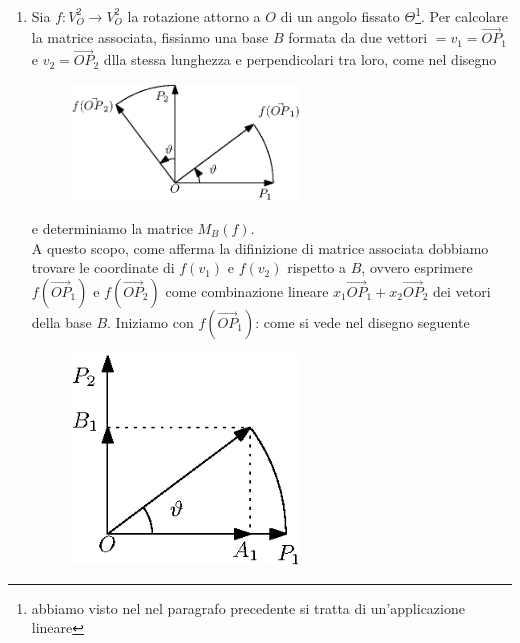 \begin{esempio}
  \label{es:4.3}
  \begin{enumerate}
  \item Sia $f:V_O^2\to V_O^2$ la rotazione attorno a $O$ di un angolo fissato $\Theta$\footnote{abbiamo visto nel
      nel paragrafo precedente si tratta di un'applicazione lineare}. Per calcolare la matrice associata, fissiamo
    una base $B$ formata da due vettori $=v_1=\vec{OP}_1$ e $v_2=\vec{OP}_2$ dlla stessa lunghezza e
    perpendicolari tra loro, come nel disegno
    \begin{figure}[th]
      \centering
        \includegraphics[width=6cm]{img/finiti/imgex4-3-1.eps}
    \end{figure}

    e determiniamo la matrice $M_B(f)$.\\
    A questo scopo, come afferma la difinizione di matrice associata dobbiamo trovare le coordinate di $f(v_1)$ e
    $f(v_2)$ rispetto a $B$, ovvero esprimere $f(\vec{OP}_1)$ e $f(\vec{OP}_2)$ come combinazione lineare
    $x_1\vec{OP}_1+x_2\vec{OP}_2$ dei vetori della base $B$. Iniziamo con $f(\vec{OP}_1)$: come si vede nel
    disegno seguente
    \clearpage
    \begin{figure}[th]
      \centering
        \includegraphics[width=6cm]{img/finiti/imgex4-3-2.eps}
    \end{figure}


\end{enumerate}
\end{esempio}
